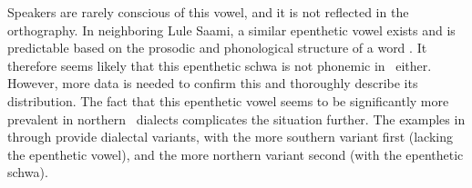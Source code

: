 Speakers are rarely conscious of this vowel, and it is not reflected in the orthography. In neighboring Lule Saami, a similar epenthetic vowel exists and is predictable based on the prosodic and phonological structure of a word \citep[cf.][14-15]{Spiik1989}. It therefore seems likely that this epenthetic schwa is not phonemic in \PS\ either. However, more data is needed to confirm this and thoroughly describe its distribution. The fact that this epenthetic vowel seems to be significantly more prevalent in northern \PS\ dialects complicates the situation further. The examples in  through  provide dialectal variants, with the more southern variant first (lacking the epenthetic vowel), and the more northern variant second (with the epenthetic schwa).
\ea\label{quick}
\z
\ea\label{deliciousPRED}
\z
\ea\label{whitefishNOMSG}
\z



%